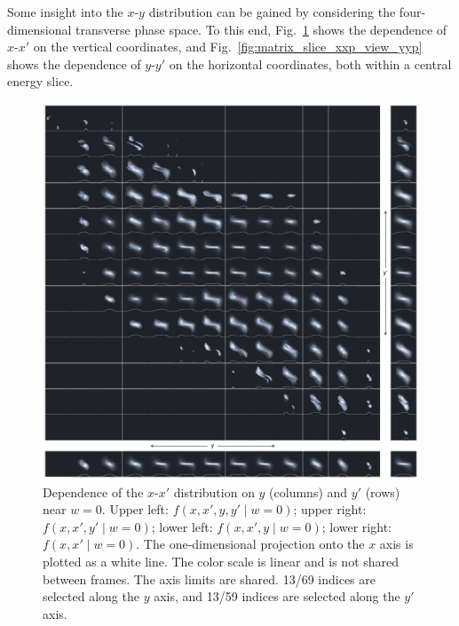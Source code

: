 \documentclass[%
 reprint,
 amsmath,amssymb,
 aps,
prstab,
]{revtex4-2}
\begin{document}
Some insight into the $x$-$y$ distribution can be gained by considering the four-dimensional transverse phase space. To this end, Fig.~\ref{fig:matrix_slice_yyp_view_xxp} shows the dependence of $x$-$x'$ on the vertical coordinates, and Fig.~\ref{fig:matrix_slice_xxp_view_yyp} shows the dependence of $y$-$y'$ on the horizontal coordinates, both within a central energy slice.
%
\begin{figure}[]
    \centering
    \includegraphics[width=\textwidth]{fig8.pdf}
    \caption{Dependence of the $x$-$x'$ distribution on $y$ (columns) and $y'$ (rows) near $w = 0$. Upper left: $f(x, x', y, y' \mid w{=}0)$; upper right: $f(x, x', y' \mid w{=}0)$; lower left: $f(x, x', y \mid w{=}0)$; lower right: $f(x, x' \mid w{=}0)$. The one-dimensional projection onto the $x$ axis is plotted as a white line. The color scale is linear and is not shared between frames. The axis limits are shared. 13/69 indices are selected along the $y$ axis, and 13/59 indices are selected along the $y'$ axis.}
    \label{fig:matrix_slice_yyp_view_xxp}
\end{figure}
%
%
\end{document}
